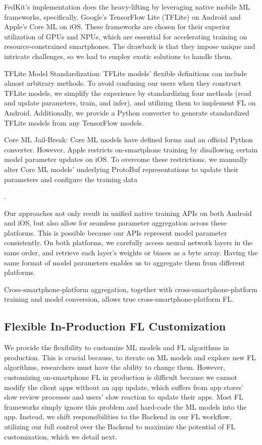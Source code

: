 \documentclass[letterpaper]{article} %
\begin{document}
FedKit's implementation does the heavy-lifting by leveraging
native mobile ML frameworks, specifically,
Google's TensorFlow Lite (TFLite) on Android and Apple's Core ML on iOS.
These frameworks are chosen for their superior utilization of GPUs and NPUs,
which are essential for accelerating training on resource-constrained smartphones.
The drawback is that they impose unique and intricate challenges,
so we had to employ exotic solutions to handle them.
\begin{enumerate*}[label=\arabic*)]
    \item TFLite Model Standardization:
        TFLite models' flexible definitions can include almost arbitrary methods.
        To avoid confusing our users when they construct TFLite models,
        we simplify the experience by standardizing four methods
        (read and update parameters, train, and infer),
        and utilizing them to implement FL on Android.
        Additionally, we provide a Python converter to generate
        standardized TFLite models from any TensorFlow models.
    \item Core ML Jail-Break:
        Core ML models have defined forms and an official Python converter.
        However, Apple restricts on-smartphone training by disallowing
        certain model parameter updates on iOS.
        To overcome these restrictions, we manually alter
        Core ML models' underlying ProtoBuf representations to
        update their parameters and configure the training data
\end{enumerate*}.

Our approaches not only result in unified native training APIs on
both Android and iOS, but also
allow for seamless parameter aggregation across these platforms.
This is possible because our APIs represent model parameter consistently.
On both platforms,
we carefully access neural network layers in the same order,
and retrieve each layer's weights or biases as a byte array.
Having the same format of model parameters enables us to
aggregate them from different platforms.

Cross-smartphone-platform aggregation,
together with cross-smartphone-platform training and model conversion,
allows true cross-smartphone-platform FL.

\subsection{Flexible In-Production FL Customization}
\newcommand{\model}{$M$}
\newcommand{\fs}{$S_\mathrm F$}
We provide the flexibility to customize ML models and FL algorithms
in production.
This is crucial because, to iterate on ML models and explore new FL algorithms,
researchers must have the ability to change them.
However, customizing on-smartphone FL in production is difficult because
we cannot modify the client apps without an app update,
which suffers from app stores' slow review processes and
users' slow reaction to update their apps.
Most FL frameworks simply ignore this problem and
hard-code the ML models into the app.
Instead, we shift responsibilities to the Backend in our FL workflow,
utilizing our full control over the Backend to
maximize the potential of FL customization,
which we detail next.
\end{document}
